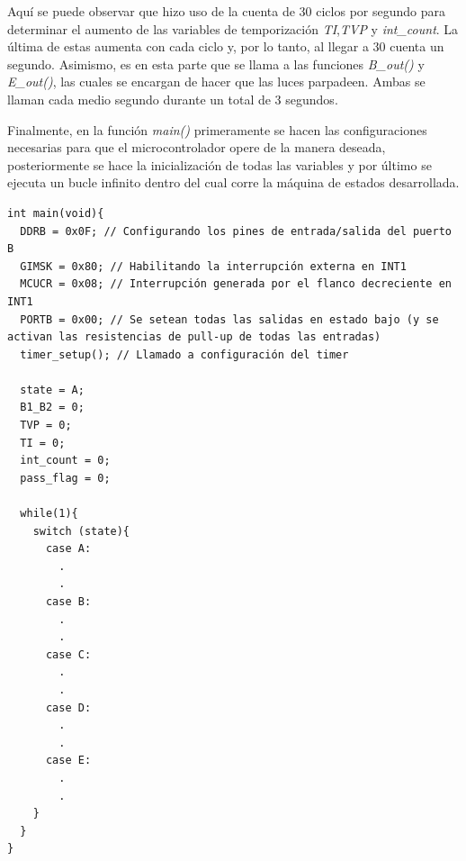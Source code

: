 Aquí se puede observar que hizo uso de la cuenta de 30 ciclos por segundo para determinar el aumento de las variables de temporización \textit{TI},\textit{TVP} y \textit{int\_count}. La última de estas aumenta con cada ciclo y, por lo tanto, al llegar a 30 cuenta un segundo. Asimismo, es en esta parte que se llama a las funciones \textit{B\_out()} y \textit{E\_out()}, las cuales se encargan de hacer que las luces parpadeen. Ambas se llaman cada medio segundo durante un total de 3 segundos.

Finalmente, en la función \textit{main()} primeramente se hacen las configuraciones necesarias para que el microcontrolador opere de la manera deseada, posteriormente se hace la inicialización de todas las variables y por último se ejecuta un bucle infinito dentro del cual corre la máquina de estados desarrollada.

\begin{verbatim}
int main(void){
  DDRB = 0x0F; // Configurando los pines de entrada/salida del puerto B
  GIMSK = 0x80; // Habilitando la interrupción externa en INT1  
  MCUCR = 0x08; // Interrupción generada por el flanco decreciente en INT1
  PORTB = 0x00; // Se setean todas las salidas en estado bajo (y se activan las resistencias de pull-up de todas las entradas)
  timer_setup(); // Llamado a configuración del timer

  state = A;
  B1_B2 = 0;
  TVP = 0;
  TI = 0;
  int_count = 0;
  pass_flag = 0;

  while(1){
    switch (state){
      case A:
        .
        .
      case B:
        .
        .
      case C:
        .
        .
      case D:
        .
        .
      case E:
        .
        .
    }
  }
}
\end{verbatim}












